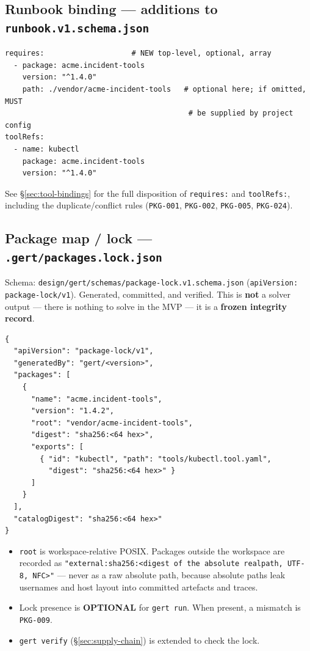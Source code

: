 \subsection{Runbook binding --- additions to \texttt{runbook.v1.schema.json}}
\label{sec:tool-runbook-binding}

\begin{verbatim}
requires:                    # NEW top-level, optional, array
  - package: acme.incident-tools
    version: "^1.4.0"
    path: ./vendor/acme-incident-tools   # optional here; if omitted, MUST
                                          # be supplied by project config
toolRefs:
  - name: kubectl
    package: acme.incident-tools
    version: "^1.4.0"
\end{verbatim}

See \S\ref{sec:tool-bindings} for the full disposition of \texttt{requires:}
and \texttt{toolRefs:}, including the duplicate/conflict rules
(\texttt{PKG-001}, \texttt{PKG-002}, \texttt{PKG-005}, \texttt{PKG-024}).

\subsection{Package map / lock --- \texttt{.gert/packages.lock.json}}
\label{sec:tool-package-lock}

Schema: \texttt{design/gert/schemas/package-lock.v1.schema.json}
(\texttt{apiVersion: package-lock/v1}). Generated, committed, and verified.
This is \textbf{not} a solver output --- there is nothing to solve in the
MVP --- it is a \textbf{frozen integrity record}.

\begin{verbatim}
{
  "apiVersion": "package-lock/v1",
  "generatedBy": "gert/<version>",
  "packages": [
    {
      "name": "acme.incident-tools",
      "version": "1.4.2",
      "root": "vendor/acme-incident-tools",
      "digest": "sha256:<64 hex>",
      "exports": [
        { "id": "kubectl", "path": "tools/kubectl.tool.yaml",
          "digest": "sha256:<64 hex>" }
      ]
    }
  ],
  "catalogDigest": "sha256:<64 hex>"
}
\end{verbatim}

\begin{itemize}
  \item \texttt{root} is workspace-relative POSIX. Packages outside the
        workspace are recorded as
        \texttt{"external:sha256:<digest of the absolute realpath, UTF-8,
        NFC>"} --- never as a raw absolute path, because absolute paths leak
        usernames and host layout into committed artefacts and traces.
  \item Lock presence is \textbf{OPTIONAL} for \texttt{gert run}. When
        present, a mismatch is \texttt{PKG-009}.
  \item \texttt{gert verify} (\S\ref{sec:supply-chain}) is extended to check
        the lock.
\end{itemize}

